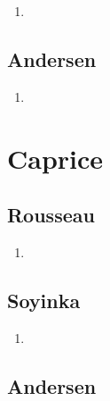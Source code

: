 \documentclass[a4paper, 11pt, hidelinks]{article}
\begin{document}
\begin{enumerate}
    \item 
\end{enumerate}




\subsection{Andersen}


\begin{enumerate}
    \item 
\end{enumerate}



































\section{Caprice}



\subsection{Rousseau}


\begin{enumerate}
    \item 
\end{enumerate}



\subsection{Soyinka}


\begin{enumerate}
    \item 
\end{enumerate}




\subsection{Andersen}
\end{document}
